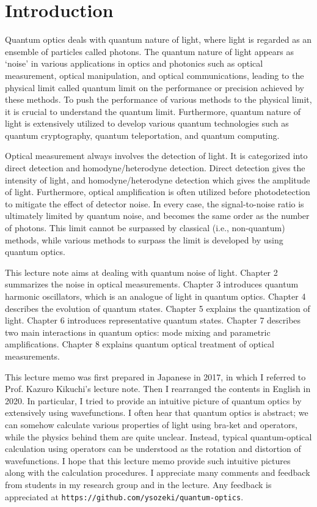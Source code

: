 \chapter{Introduction}
Quantum optics deals with quantum nature of light, where light is regarded as an ensemble of particles called photons. The quantum nature of light appears as `noise' in various applications in optics and photonics such as optical measurement, optical manipulation, and optical communications, leading to the physical limit called quantum limit on the performance or precision achieved by these methods. To push the performance of various methods to the physical limit, it is crucial to understand the quantum limit. Furthermore, quantum nature of light is extensively utilized to develop various quantum technologies such as quantum cryptography, quantum teleportation, and quantum computing. 

Optical measurement always involves the detection of light. It is categorized into direct detection and homodyne/heterodyne detection. Direct detection gives the intensity of light, and homodyne/heterodyne detection which gives the amplitude of light. Furthermore, optical amplification is often utilized before photodetection to mitigate the effect of detector noise. In every case, the signal-to-noise ratio is ultimately limited by quantum noise, and becomes the same order as the number of photons. This limit cannot be surpassed by classical (i.e., non-quantum) methods, while various methods to surpass the limit is developed by using quantum optics.

This lecture note aims at dealing with quantum noise of light. Chapter 2 summarizes the noise in optical measurements. Chapter 3 introduces quantum harmonic oscillators, which is an analogue of light in quantum optics. Chapter 4 describes the evolution of quantum states. Chapter 5 explains the quantization of light. Chapter 6 introduces representative quantum states. Chapter 7 describes two main interactions in quantum optics: mode mixing and parametric amplifications. Chapter 8 explains quantum optical treatment of optical measurements.

This lecture memo was first prepared in Japanese in 2017, in which I referred to Prof. Kazuro Kikuchi's lecture note. Then I rearranged the contents in English in 2020. In particular, I tried to provide an intuitive picture of quantum optics by extensively using wavefunctions. I often hear that quantum optics is abstract; we can somehow calculate various properties of light using bra-ket and operators, while the physics behind them are quite unclear. Instead, typical quantum-optical calculation using operators can be understood as the rotation and distortion of wavefunctions. I hope that this lecture memo provide such intuitive pictures along with the calculation procedures.  I appreciate many comments and feedback from students in my research group and in the lecture. Any feedback is appreciated at \texttt{https://github.com/ysozeki/quantum-optics}.
